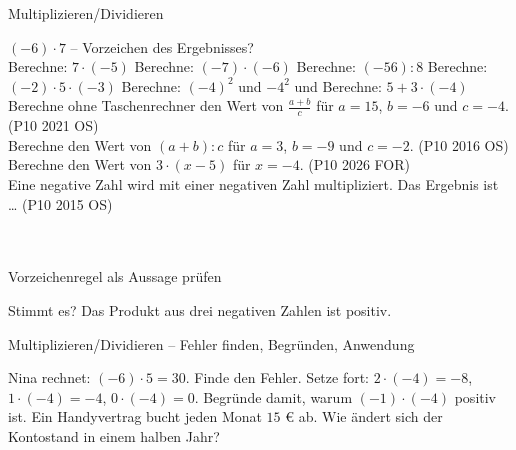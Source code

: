 \setcounter{aufgabe}{19}

\begin{aufgabe}{Multiplizieren/Dividieren}
\begin{teile}
\teil $(-6) \cdot 7$ – Vorzeichen des Ergebnisses?\\  
\teil Berechne: $7 \cdot (-5)$ \leerfeld
\teil Berechne: $(-7) \cdot (-6)$ \leerfeld
\teil Berechne: $(-56) : 8$ \leerfeld
\teil Berechne: $(-2) \cdot 5 \cdot (-3)$ \leerfeld
\teil Berechne: $(-4)^2$ und $-4^2$ \leerfeld und \leerfeld
\teil Berechne: $5 + 3 \cdot (-4)$ \leerfeld
\teil Berechne ohne Taschenrechner den Wert von $\frac{a + b}{c}$ für $a = 15$, $b = -6$ und $c = -4$. \hfill (P10 2021 OS) \\ \leerfeld
\teil Berechne den Wert von $(a + b) : c$ für $a = 3$, $b = -9$ und $c = -2$. \hfill (P10 2016 OS) \\ \leerfeld
\teil Berechne den Wert von $3 \cdot (x - 5)$ für $x = -4$. \hfill (P10 2026 FOR) \\ \leerfeld
\teil Eine negative Zahl wird mit einer negativen Zahl multipliziert. Das Ergebnis ist … \hfill (P10 2015 OS)\\ \\ \\ 
\end{teile}
\end{aufgabe}

\begin{aufgabe}{Vorzeichenregel als Aussage prüfen}
\begin{teile}
\teil Stimmt es? Das Produkt aus drei negativen Zahlen ist positiv. \janein
\end{teile}
\end{aufgabe}

\begin{aufgabe}{Multiplizieren/Dividieren – Fehler finden, Begründen, Anwendung}
\begin{teile}
\teil Nina rechnet: $(-6) \cdot 5 = 30$. Finde den Fehler.
\teil Setze fort: $2 \cdot (-4) = -8$, $1 \cdot (-4) = -4$, $0 \cdot (-4) = 0$. Begründe damit, warum $(-1) \cdot (-4)$ positiv ist.
\teil Ein Handyvertrag bucht jeden Monat $15$ € ab. Wie ändert sich der Kontostand in einem halben Jahr?
\end{teile}
\end{aufgabe}
